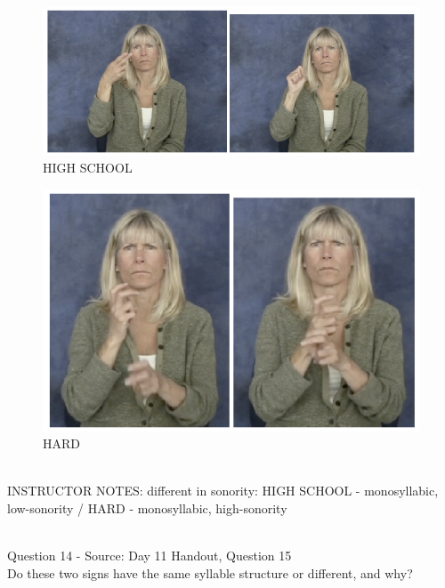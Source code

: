 \documentclass[12pt]{article}
\begin{document}
\begin{figure}[H]
\includegraphics{../images/asl_highschool.png}
\caption{HIGH SCHOOL}
\end{figure}
\begin{figure}[H]
\includegraphics{../images/asl_hard.png}
\caption{HARD}
\end{figure}

~\\
INSTRUCTOR NOTES: different in sonority: HIGH SCHOOL - monosyllabic, low-sonority / HARD - monosyllabic, high-sonority


~\\

{\large Question 14} - Source: Day 11 Handout, Question 15\\

Do these two signs have the same syllable structure or different, and why?\\
\end{document}
